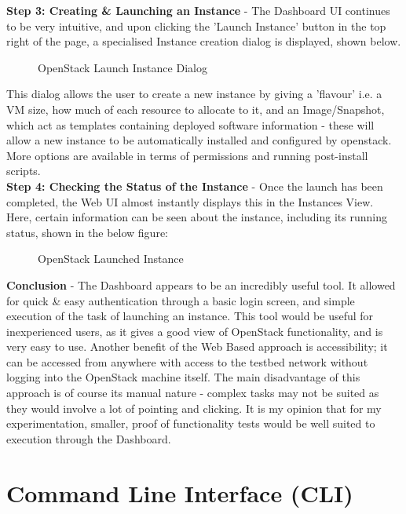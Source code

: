 \textbf{Step 3: Creating \& Launching an Instance} - The Dashboard UI continues to be very intuitive, and upon clicking the 'Launch Instance' button in the top right of the page, a specialised Instance creation dialog is displayed, shown below. 
\begin{figure}[H]
\centering
{}
\caption{OpenStack Launch Instance Dialog}
\end{figure}

This dialog allows the user to create a new instance by giving a 'flavour' i.e. a VM size, how much of each resource to allocate to it, and an Image/Snapshot, which act as templates containing deployed software information - these will allow a new instance to be automatically installed and configured by openstack. More options are available in terms of permissions and running post-install scripts. \\

\textbf{Step 4: Checking the Status of the Instance} - Once the launch has been completed, the Web UI almost instantly displays this in the Instances View. Here, certain information can be seen about the instance, including its running status, shown in the below figure:
\begin{figure}[H]
\centering
{}
\caption{OpenStack Launched Instance}
\end{figure}

\textbf{Conclusion} - 
The Dashboard appears to be an incredibly useful tool. It allowed for quick \& easy authentication through a basic login screen, and simple execution of the task of launching an instance. This tool would be useful for inexperienced users, as it gives a good view of OpenStack functionality, and is very easy to use. Another benefit of the Web Based approach is accessibility; it can be accessed from anywhere with access to the testbed network without logging into the OpenStack machine itself. The main disadvantage of this approach is of course its manual nature - complex tasks may not be suited as they would involve a lot of pointing and clicking. It is my opinion that for my experimentation, smaller, proof of functionality tests would be well suited to execution through the Dashboard.  

\section{Command Line Interface (CLI)}

